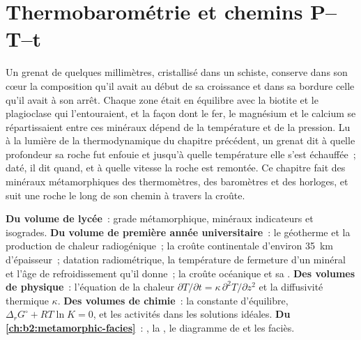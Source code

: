 \chapter{Thermobarométrie et chemins P--T--t}\label{ch:b2:pt-paths}

Un grenat de quelques millimètres, cristallisé dans un schiste, conserve dans son cœur la composition
qu'il avait au début de sa croissance et dans sa bordure celle qu'il avait à son arrêt. Chaque
zone était en équilibre avec la biotite et le plagioclase qui l'entouraient, et la
façon dont le fer, le magnésium et le calcium se répartissaient entre ces minéraux dépend de la température
et de la pression. Lu à la lumière de la thermodynamique du chapitre précédent, un grenat dit
à quelle profondeur sa roche fut enfouie et jusqu'à quelle température elle s'est échauffée~; daté, il dit quand, et à quelle vitesse la
roche est remontée. Ce chapitre fait des minéraux métamorphiques des thermomètres, des baromètres
et des horloges, et suit une roche le long de son chemin à travers la croûte.

\begin{recall}
\textbf{Du volume de lycée}~: grade métamorphique, minéraux indicateurs et isogrades.
\textbf{Du volume de première année universitaire}~: le géotherme et la production de chaleur radiogénique~; la
croûte continentale d'environ \qty{35}{km} d'épaisseur~; datation radiométrique, la température de fermeture
d'un minéral et l'âge de refroidissement qu'il donne~; la croûte océanique et sa .
\textbf{Des volumes de physique}~: l'équation de la chaleur $\partial T/\partial t = \kappa\,
\partial^2 T/\partial z^2$ et la diffusivité thermique $\kappa$. \textbf{Des volumes de
chimie}~: la constante d'équilibre, $\Delta_r G^\circ + RT\ln K = 0$, et les activités dans
les solutions idéales. \textbf{Du \cref{ch:b2:metamorphic-facies}}~: ,
la , le diagramme de  et les faciès.
\end{recall}

